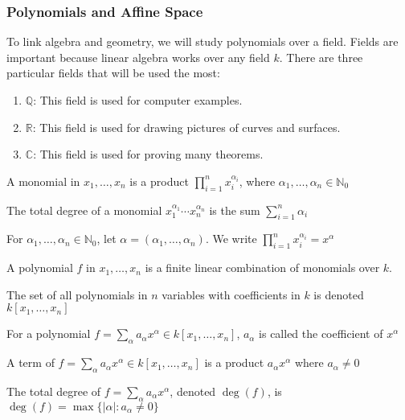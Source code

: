 \documentclass[crop=false,class=book]{standalone}
\begin{document}
\subsubsection{Polynomials and Affine Space}
To link algebra and geometry, we will study polynomials over a field. Fields are important because linear algebra works over any field $k$. There are three particular fields that will be used the most:
\begin{enumerate}
    \item $\mathbb{Q}$: This field is used for computer examples.
    \item $\mathbb{R}$: This field is used for drawing pictures of curves and surfaces.
    \item $\mathbb{C}$: This field is used for proving many theorems.
\end{enumerate}
\begin{definition}
A monomial in $x_1,\hdots,x_n$ is a product $\prod_{i=1}^{n}x_{i}^{\alpha_{i}}$, where $\alpha_{1},\hdots,\alpha_{n}\in\mathbb{N}_0$
\end{definition}
\begin{definition}
The total degree of a monomial $x_1^{\alpha_1}\cdots x_n^{\alpha_n}$ is the sum $\sum_{i=1}^{n}\alpha_{i}$
\end{definition}
\begin{notation}
For $\alpha_1,\hdots, \alpha_n\in \mathbb{N}_0$, let $\alpha = (\alpha_1,\hdots ,\alpha_n)$. We write $\prod_{i=1}^{n}x_{i}^{\alpha_{i}}=x^{\alpha}$
\end{notation}
\begin{definition}
A polynomial $f$ in $x_1,\hdots, x_n$ is a finite linear combination of monomials over $k$.
\end{definition}
\begin{notation}
The set of all polynomials in $n$ variables with coefficients in $k$ is denoted $k[x_1,\hdots ,x_n]$
\end{notation}
\begin{definition}
For a polynomial $f = \sum_{\alpha} a_\alpha x^\alpha \in k[x_1,\hdots ,x_n]$, $a_\alpha$ is called the coefficient of $x^\alpha$
\end{definition}
\begin{definition}
A term of $f=\sum_{\alpha} a_\alpha x^\alpha \in k[x_1,\hdots ,x_n]$ is a product $a_\alpha x^\alpha$ where $a_\alpha \ne 0$
\end{definition}
\begin{definition}
The total degree of $f=\sum_{\alpha}a_\alpha x^\alpha$, denoted $\deg(f)$, is $\deg(f) = \max\{|\alpha|:a_\alpha \ne 0\}$
\end{definition}
\end{document}
